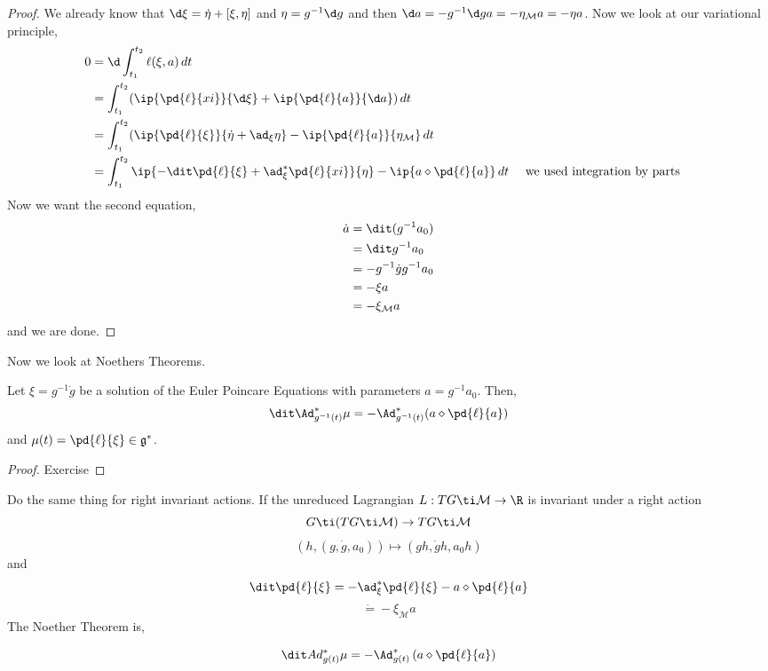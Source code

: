 \begin{proof}
  We already know that $\d \xi = \dot \eta + [\xi, \eta]$ and $\eta = g^{-1}\d g$ and then $\d a = -g^{-1}\d g a = -\eta_{\mathcal{M}} a = -\eta a$. Now we look at our variational principle,
  \begin{align*}
    0 &= \d\int_{t_1}^{t_2} \ell(\xi, a)\, dt \\
    &= \int_{t_1}^{t_2} (\ip{\pd{\ell}{xi}}{\d \xi} + \ip{\pd{\ell}{a}}{\d a})\, dt \\
    &= \int_{t_1}^{t_2} (\ip{\pd{\ell}{\xi}}{\dot \eta + \ad_{\xi} \eta} - \ip{\pd{\ell}{a}}{\eta_\mathcal{M}}\, dt \\
    &= \int_{t_1}^{t_2} \ip{ -\dit \pd{\ell}{\xi} + \ad^*_\xi \pd{\ell}{xi}}{\eta} - \ip{a \diamond \pd{\ell}{a}}\, dt && \text{ we used integration by parts}
  \end{align*}
  Now we want the second equation,
  \begin{align*}
    \dot a &= \dit (g^{-1}a_0) \\
    &= \dit g^{-1} a_0 \\
    &= -g^{-1}\dot g g^{-1} a_0 \\
    &= -\xi a \\
    &= -\xi_\mathcal{M} a
  \end{align*}
  and we are done.
\end{proof}

Now we look at Noethers Theorems.
\begin{nthm}
  Let $\xi = g^{-1}\dot g$ be a solution of the Euler Poincare Equations with parameters $a = g^{-1}a_0$. Then,
  $$ \dit \Ad^*_{g^{-1}(t)} \mu = -\Ad^*_{g^{-1}(t)} (a \diamond \pd{\ell}{a}) $$
  and $\mu(t) = \pd{\ell}{\xi} \in \mathfrak{g}^*$.
\end{nthm}
\begin{proof}
  Exercise
\end{proof}

\begin{exercise}
  Do the same thing for right invariant actions. If the unreduced Lagrangian $L : TG \ti \mathcal{M} \to \R$ is invariant under a right action
  $$G \ti (TG \ti \mathcal{M}) \to TG \ti \mathcal{M}$$
  $$ (h, (g, \dot g, a_0)) \mapsto (gh, \dot g h, a_0h) $$
  and
  $$ \dit \pd{\ell}{\xi} = -\ad^*_\xi \pd{\ell}{\xi} - a\diamond \pd{\ell}{a} $$
  $$ \dot  = -\xi_\mathcal{M}a $$
  The Noether Theorem is,
  \begin{nthm}
    $$ \dit Ad^*_{g(t)} \mu = -\Ad^*_{g(t)} \left(a \diamond \pd{\ell}{a}\right) $$
  \end{nthm}
\end{exercise}
